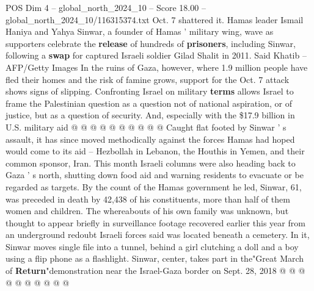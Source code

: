 \begin{textsample}{POS Dim 4 – global\_north\_2024\_10 – Score 18.00 – global\_north\_2024\_10/116315374.txt}
Oct. 7 shattered it.
Hamas leader Ismail Haniya and Yahya Sinwar, a founder of Hamas ' military wing, wave as supporters celebrate the \textbf{release} of hundreds of \textbf{prisoners}, including Sinwar, following a \textbf{swap} for captured Israeli soldier Gilad Shalit in 2011.
Said Khatib -- AFP/Getty Images In the ruins of Gaza, however, where 1.9 million people have fled their homes and the risk of famine grows, support for the Oct. 7 attack shows signs of slipping.
Confronting Israel on military \textbf{terms} allows Israel to frame the Palestinian question as a question not of national aspiration, or of justice, but as a question of security.
And, especially with the \$17.9 billion in U.S. military aid @ @ @ @ @ @ @ @ @ @ Caught flat footed by Sinwar ' s assault, it has since moved methodically against the forces Hamas had hoped would come to its aid -- Hezbollah in Lebanon, the Houthis in Yemen, and their common sponsor, Iran.
This month Israeli columns were also heading back to Gaza ' s north, shutting down food aid and warning residents to evacuate or be regarded as targets.
By the count of the Hamas government he led, Sinwar, 61, was preceded in death by 42,438 of his constituents, more than half of them women and children.
The whereabouts of his own family was unknown, but thought to appear briefly in surveillance footage recovered earlier this year from an underground redoubt Israeli forces said was located beneath a cemetery.
In it, Sinwar moves single file into a tunnel, behind a girl clutching a doll and a boy using a flip phone as a flashlight.
Sinwar, center, takes part in the"Great March of \textbf{Return}"demonstration near the Israel-Gaza border on Sept. 28, 2018 @ @ @ @ @ @ @ @ @ @

\end{textsample}
